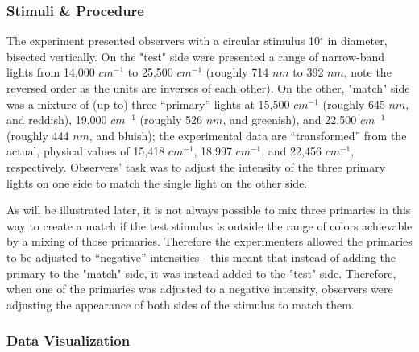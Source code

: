 \documentclass{article}
\begin{document}
\begin{multicols}{2}
\subsubsection{Stimuli \& Procedure} %

The experiment presented observers with a circular stimulus 10$^\circ$ in diameter, bisected vertically.  On the "test" side were presented a range of narrow-band lights from 14,000 $cm^{-1}$ to 25,500 $cm^{-1}$ (roughly 714 $nm$ to 392 $nm$, note the reversed order as the units are inverses of each other).  On the other, "match" side was a mixture of (up to) three “primary” lights at 15,500 $cm^{-1}$ (roughly 645 $nm$, and reddish), 19,000 $cm^{-1}$ (roughly 526 $nm$, and greenish), and 22,500 $cm^{-1}$ (roughly 444 $nm$, and bluish); the experimental data are “transformed” from the actual, physical values of 15,418 $cm^{-1}$, 18,997 $cm^{-1}$, and 22,456 $cm^{-1}$, respectively.  Observers’ task was to adjust the intensity of the three primary lights on one side to match the single light on the other side.

As will be illustrated later, it is not always possible to mix three primaries in this way to create a match if the test stimulus is outside the range of colors achievable by a mixing of those primaries.  Therefore the experimenters allowed the primaries to be adjusted to “negative” intensities - this meant that instead of adding the primary to the "match" side, it was instead added to the "test" side.  Therefore, when one of the primaries was adjusted to a negative intensity, observers were adjusting the appearance of both sides of the stimulus to match them.

\subsubsection{Data Visualization} %


\end{multicols}
\end{document}
